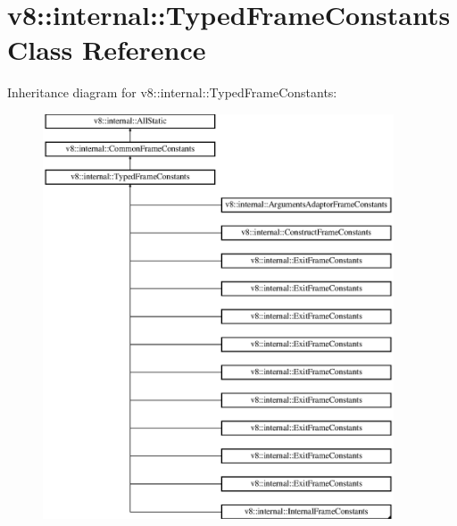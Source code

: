 \hypertarget{classv8_1_1internal_1_1_typed_frame_constants}{}\section{v8\+:\+:internal\+:\+:Typed\+Frame\+Constants Class Reference}
\label{classv8_1_1internal_1_1_typed_frame_constants}
Inheritance diagram for v8\+:\+:internal\+:\+:Typed\+Frame\+Constants\+:\begin{figure}[H]
\begin{center}
\leavevmode
\includegraphics[height=12.000000cm]{classv8_1_1internal_1_1_typed_frame_constants}
\end{center}
\end{figure}
